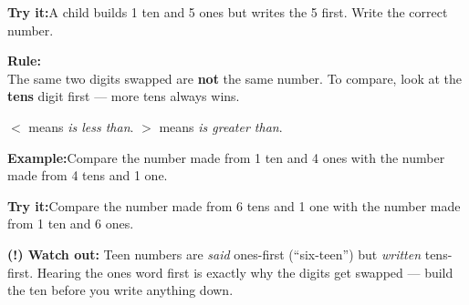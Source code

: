 \documentclass[12pt]{article}
\begin{document}
\begin{tryitbox}
\textbf{Try it:}\quad A child builds 1 ten and 5 ones but writes the 5 first.
Write the correct number.\\[2pt]
\end{tryitbox}


\begin{formulabox}
\textbf{Rule:}\\[4pt]
The same two digits swapped are \textbf{not} the same number.
To compare, look at the \textbf{tens} digit first --- more tens always wins.\par
\smallskip
$<$ means \emph{is less than}. \qquad $>$ means \emph{is greater than}.
\end{formulabox}

\begin{examplebox}
\textbf{Example:}\quad Compare the number made from 1 ten and 4 ones with the
number made from 4 tens and 1 one.
\end{examplebox}

\begin{tryitbox}
\textbf{Try it:}\quad Compare the number made from 6 tens and 1 one with the number
made from 1 ten and 6 ones.\\[2pt]
\end{tryitbox}

\begin{watchoutbox}
\textbf{(!) Watch out:} Teen numbers are \emph{said} ones-first (``six-teen'') but
\emph{written} tens-first. Hearing the ones word first is exactly why the digits
get swapped --- build the ten before you write anything down.
\end{watchoutbox}
\end{document}
